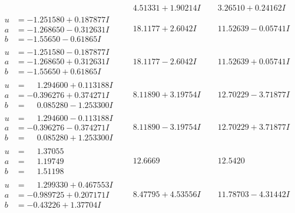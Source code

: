 \documentclass[1p]{elsarticle_modified}
\theoremstyle{definition}
\begin{document}
$$\begin{array}{c|c|c}
 & \phantom{-}4.51331 + 1.90214 I & \phantom{-}3.26510 + 0.24162 I \\ \hline\begin{aligned}
u &= -1.251580 + 0.187877 I \\
a &= -1.268650 - 0.312631 I \\
b &= -1.55650 - 0.61865 I\end{aligned}
 & \phantom{-}18.1177 + 2.6042 I & \phantom{-}11.52639 - 0.05741 I \\ \hline\begin{aligned}
u &= -1.251580 - 0.187877 I \\
a &= -1.268650 + 0.312631 I \\
b &= -1.55650 + 0.61865 I\end{aligned}
 & \phantom{-}18.1177 - 2.6042 I & \phantom{-}11.52639 + 0.05741 I \\ \hline\begin{aligned}
u &= \phantom{-}1.294600 + 0.113188 I \\
a &= -0.396276 + 0.374271 I \\
b &= \phantom{-}0.085280 - 1.253300 I\end{aligned}
 & \phantom{-}8.11890 + 3.19754 I & \phantom{-}12.70229 - 3.71877 I \\ \hline\begin{aligned}
u &= \phantom{-}1.294600 - 0.113188 I \\
a &= -0.396276 - 0.374271 I \\
b &= \phantom{-}0.085280 + 1.253300 I\end{aligned}
 & \phantom{-}8.11890 - 3.19754 I & \phantom{-}12.70229 + 3.71877 I \\ \hline\begin{aligned}
u &= \phantom{-}1.37055\phantom{ +0.000000I} \\
a &= \phantom{-}1.19749\phantom{ +0.000000I} \\
b &= \phantom{-}1.51198\phantom{ +0.000000I}\end{aligned}
 & \phantom{-}12.6669\phantom{ +0.000000I} & \phantom{-}12.5420\phantom{ +0.000000I} \\ \hline\begin{aligned}
u &= \phantom{-}1.299330 + 0.467553 I \\
a &= -0.989725 + 0.207171 I \\
b &= -0.43226 + 1.37704 I\end{aligned}
 & \phantom{-}8.47795 + 4.53556 I & \phantom{-}11.78703 - 4.31442 I \\ \hline\begin{aligned}

\end{aligned}
\end{array}$$
\end{document}
